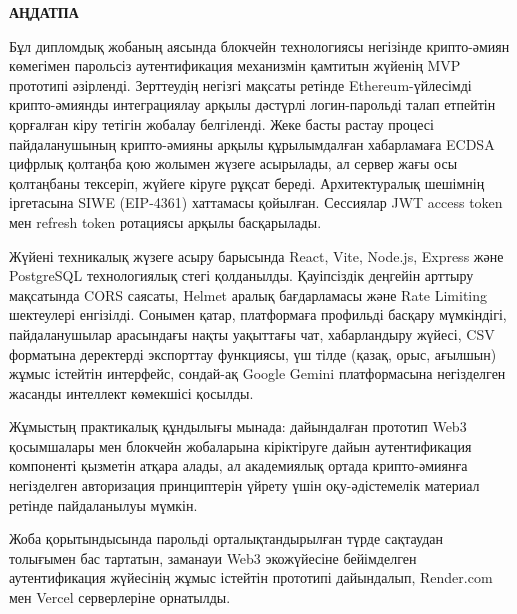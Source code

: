 \documentclass[14pt,a4paper]{extarticle}
\begin{document}


\newpage\thispagestyle{empty}
\small
\begin{center}\textbf{АҢДАТПА}\end{center}

Бұл дипломдық жобаның аясында блокчейн технологиясы негізінде крипто-әмиян көмегімен парольсіз аутентификация механизмін қамтитын жүйенің MVP прототипі әзірленді. Зерттеудің негізгі мақсаты ретінде Ethereum-үйлесімді крипто-әмиянды интеграциялау арқылы дәстүрлі логин-парольді талап етпейтін қорғалған кіру тетігін жобалау белгіленді. Жеке басты растау процесі пайдаланушының крипто-әмияны арқылы құрылымдалған хабарламаға ECDSA цифрлық қолтаңба қою жолымен жүзеге асырылады, ал сервер жағы осы қолтаңбаны тексеріп, жүйеге кіруге рұқсат береді. Архитектуралық шешімнің іргетасына SIWE (EIP-4361) хаттамасы қойылған. Сессиялар JWT access token мен refresh token ротациясы арқылы басқарылады.

Жүйені техникалық жүзеге асыру барысында React, Vite, Node.js, Express және PostgreSQL технологиялық стегі қолданылды. Қауіпсіздік деңгейін арттыру мақсатында CORS саясаты, Helmet аралық бағдарламасы және Rate Limiting шектеулері енгізілді. Сонымен қатар, платформаға профильді басқару мүмкіндігі, пайдаланушылар арасындағы нақты уақыттағы чат, хабарландыру жүйесі, CSV форматына деректерді экспорттау функциясы, үш тілде (қазақ, орыс, ағылшын) жұмыс істейтін интерфейс, сондай-ақ Google Gemini платформасына негізделген жасанды интеллект көмекшісі қосылды.

Жұмыстың практикалық құндылығы мынада: дайындалған прототип Web3 қосымшалары мен блокчейн жобаларына кіріктіруге дайын аутентификация компоненті қызметін атқара алады, ал академиялық ортада крипто-әмиянға негізделген авторизация принциптерін үйрету үшін оқу-әдістемелік материал ретінде пайдаланылуы мүмкін.

Жоба қорытындысында парольді орталықтандырылған түрде сақтаудан толығымен бас тартатын, заманауи Web3 экожүйесіне бейімделген аутентификация жүйесінің жұмыс істейтін прототипі дайындалып, Render.com мен Vercel серверлеріне орнатылды.
\end{document}
